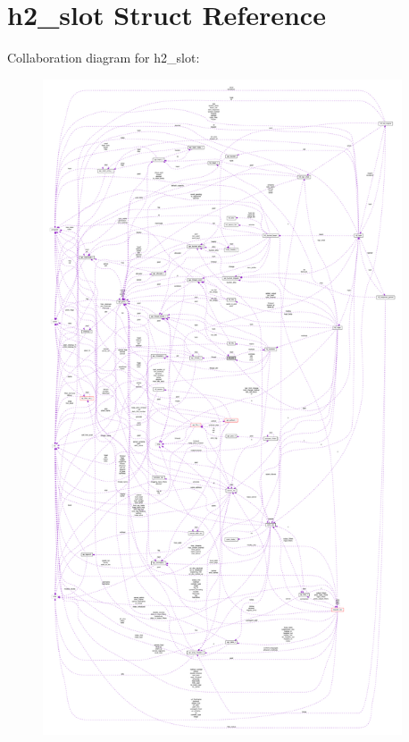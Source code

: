 \hypertarget{structh2__slot}{}\section{h2\+\_\+slot Struct Reference}
\label{structh2__slot}


Collaboration diagram for h2\+\_\+slot\+:
\nopagebreak
\begin{figure}[H]
\begin{center}
\leavevmode
\includegraphics[height=550pt]{structh2__slot__coll__graph}
\end{center}
\end{figure}
